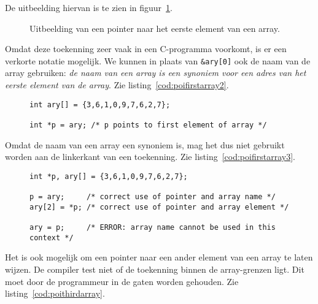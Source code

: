 De uitbeelding hiervan is te zien in figuur~\ref{fig:poifirstarray}.
%
\begin{figure}[!ht]
\centering
{}
\caption{Uitbeelding van een pointer naar het eerste element van een array.}
\label{fig:poifirstarray}
\end{figure}
%
Omdat deze toekenning zeer vaak in een C-programma voorkomt, is er een verkorte notatie mogelijk. We kunnen in plaats van \texttt{\&ary[0]} ook de naam van de array gebruiken: \textsl{de naam van een array is een synoniem voor een adres van het eerste element van de array}. Zie listing~\ref{cod:poifirstarray2}.

\begin{figure}[!ht]
\begin{lstlisting}[caption=Een pointer naar het eerste element van een array.,label=cod:poifirstarray2]
int ary[] = {3,6,1,0,9,7,6,2,7};

int *p = ary; /* p points to first element of array */
\end{lstlisting}
\end{figure}

Omdat de naam van een array een synoniem is, mag het dus niet gebruikt worden aan de linkerkant van een toekenning. Zie listing~\ref{cod:poifirstarray3}.

\begin{figure}[!ht]
\begin{lstlisting}[caption=Een pointer naar het eerste element van een array.,label=cod:poifirstarray3]
int *p, ary[] = {3,6,1,0,9,7,6,2,7};

p = ary;     /* correct use of pointer and array name */
ary[2] = *p; /* correct use of pointer and array element */

ary = p;     /* ERROR: array name cannot be used in this context */
\end{lstlisting}
\end{figure}

Het is ook mogelijk om een pointer naar een ander element van een array te laten wijzen. De compiler test niet of de toekenning binnen de array-grenzen ligt. Dit moet door de programmeur in de gaten worden gehouden. Zie listing~\ref{cod:poithirdarray}.

